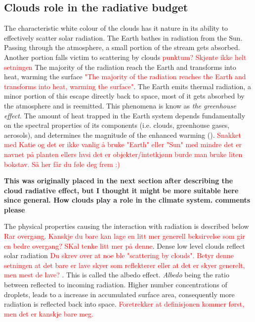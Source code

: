 \subsection{Clouds role in the radiative budget}
The characteristic white colour of the clouds has it nature in its ability to  effectively scatter solar radiation. %
The Earth bathes in radiation from the Sun. Passing through the atmosphere, a small portion of the stream gets absorbed. Another portion falls victim to scattering by clouds \textcolor{red}{punktum? Skjønte ikke helt setningen}%
The majority of the radiation reach the Earth and transforms into heat, warming the surface \textcolor{red}{"The majority of the radiation reaches the Earth and transforms into heat, warming the surface"}. The Earth emits thermal radiation, a minor portion of this escape directly back to space, most of it gets absorbed by the atmosphere and is reemitted. This phenomena is know as \textit{the greenhouse effect}. The amount of heat trapped in the Earth system depends fundamentally on the spectral properties of its components (i.e. clouds, greenhouse gases, aerosols), and determines the magnitude of the enhanced warming (\cite{greenhouse_effect}).
\textcolor{red}{Snakket med Katie og det er ikke vanlig å bruke "Earth" eller "Sun" med mindre det er navnet på planten ellers hvsi det er objekter/intetkjønn burde man bruke liten bokstav. Så her får du føle deg frem :)}

\textbf{This was originally placed in the next section after describing the cloud radiative effect, but I thought it might be more suitable here since general. How clouds play a role in the climate system. comments please}

The physical properties causing the interaction with radiation is described below \textcolor{red}{Rar overgang. Kanskje du bare kan lage en litt mer generell beksirvelse som gir en bedre overgang? SKal tenke litt mer på denne}. Dense low level clouds reflect solar radiation \textcolor{red}{Du skrev over at noe ble "scattering by clouds". Betyr denne setningen at det bare er lave skyer som reflekterer eller at det er skyer generelt, men mest de lave? }. This is called the albedo effect. \textit{Albedo} being the ratio between reflected to incoming radiation. Higher number concentrations of droplets, leads to a increase in accumulated surface area, consequently more radiation is reflected back into space. \textcolor{red}{Foretrekker at definisjonen kommer først, men det er kanskje bare meg. }

